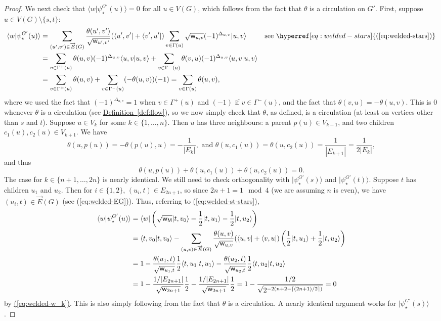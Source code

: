 \documentclass{article}
\newcommand{\eq}[1]{\hyperref[eq:#1]{(\ref*{eq:#1})}}
\newcommand{\defin}[1]{\hyperref[def:#1]{Definition~\ref*{def:#1}}}
\def\ket#1{{\lvert}#1\rangle}
\def\bra#1{{\langle}#1\rvert}
\renewcommand{\>}{\rangle}
\newcommand{\<}{\langle}
\renewcommand{\(}{\left(}
\renewcommand{\)}{\right)}
\def\braket#1#2{{{\langle}#1\vert}#2\rangle}
\def\w{{\sf w}}
\begin{document}
\begin{proof}
We next check that $\braket{w}{\psi_\star^{G'}(u)}=0$ for all $u\in V(G)$, which follows from the fact that $\theta$ is a circulation on $G'$. First, suppose $u\in V(G)\setminus\{s,t\}$:
\begin{align*}
\braket{w}{\psi_\star^{G'}(u)}&=\sum_{(u',v')\in \overrightarrow{E}(G)}\frac{\theta(u',v')}{\sqrt{\w_{u',v'}}}(\bra{u',v'}+\bra{v',u'})\sum_{v\in\Gamma(u)}\sqrt{\w_{u,v}}(-1)^{\Delta_{u,v}}\ket{u,v} & \mbox{see }\eq{welded-stars}\\
&= \sum_{v\in \Gamma^+(u)}\theta(u,v)(-1)^{\Delta_{u,v}}\braket{u,v}{u,v}+\sum_{v\in\Gamma^-(u)}\theta(v,u)(-1)^{\Delta_{u,v}}\braket{u,v}{u,v}\\
&=\sum_{v\in\Gamma^+(u)}\theta(u,v) +\sum_{v\in\Gamma^-(u)}(-\theta(u,v))(-1) = \sum_{v\in \Gamma(u)}\theta(u,v),
\end{align*}
where we used the fact that $(-1)^{\Delta_{u,v}}=1$ when $v\in\Gamma^+(u)$ and $(-1)$ if $v\in\Gamma^-(u)$, and the fact that $\theta(v,u)=-\theta(u,v)$. This is 0 whenever $\theta$ is a circulation (see \defin{flow}), so we now simply check that $\theta$, as defined, is a circulation (at least on vertices other than $s$ and $t$). Suppose $u\in V_k$ for some $k\in\{1,\dots,n\}$. Then $u$ has three neighbours: a parent $p(u)\in V_{k-1}$, and two children $c_1(u),c_2(u)\in V_{k+1}$. We have 
$$\theta(u,p(u))= -\theta(p(u),u) = -\frac{1}{|E_k|},
\mbox{ and }
\theta(u,c_1(u))=\theta(u,c_2(u)) = \frac{1}{|E_{k+1}|} = \frac{1}{2|E_k|},$$
and thus
$$\theta(u,p(u))+\theta(u,c_1(u))+\theta(u,c_2(u)) = 0.$$
The case for $k\in\{n+1,\dots,2n\}$ is nearly identical. We still need to check orthogonality with $\ket{\psi_\star^{G'}(s)}$ and $\ket{\psi_\star^{G'}(t)}$. Suppose $t$ has children $u_1$ and $u_2$. Then for $i\in\{1,2\}$, $(u_i,t)\in E_{2n+1}$, so since $2n+1=1\mod 4$ (we are assuming $n$ is even), we have $(u_i,t)\in \overrightarrow{E}(G)$ (see \eq{welded-EG}). Thus, referring to \eq{welded-st-stars}, 
\begin{align*}
\braket{w}{\psi_\star^{G'}(u)}&=\bra{w}\left(\sqrt{\w_{\sf M}}\ket{t,v_0} - \frac{1}{2}\ket{t,u_1} - \frac{1}{2}\ket{t,u_2} \right) \\
&=\braket{t,v_0}{t,v_0}-\sum_{(u,v)\in \overrightarrow{E}(G)}\frac{\theta(u,v)}{\sqrt{\w_{u,v}}}(\bra{u,v}+\bra{v,u})\left(\frac{1}{2}\ket{t,u_1}+\frac{1}{2}\ket{t,u_2} \right)\\
&= 1-\frac{\theta(u_1,t)}{\sqrt{\w_{u_1,t}}}\frac{1}{2}\braket{t,u_1}{t,u_1}-\frac{\theta(u_2,t)}{\sqrt{\w_{u_2,t}}}\frac{1}{2}\braket{t,u_2}{t,u_2}\\
&= 1-\frac{1/|E_{2n+1}|}{\sqrt{\w_{2n+1}}}\frac{1}{2} - \frac{1/|E_{2n+1}|}{\sqrt{\w_{2n+1}}}\frac{1}{2}
= 1 - \frac{1/2}{\sqrt{2^{-2(n+2-\lceil (2n+1)/2\rceil)}}} = 0
\end{align*}
by \eq{welded-w_k}.
This is also simply following from the fact that $\theta$ is a circulation. 
A nearly identical argument works for $\ket{\psi_\star^{G'}(s)}$. 


\end{proof}
\end{document}
